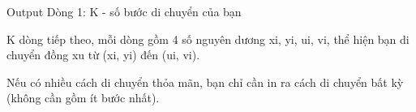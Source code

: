 Output  
Dòng 1: K - số bước di chuyển của bạn  

   K dòng tiếp theo, mỗi dòng gồm 4 số nguyên dương xi, yi, ui, vi, thể hiện bạn di chuyển đồng xu từ (xi, yi) đến (ui, vi).  

   Nếu có nhiều cách di chuyển thỏa mãn, bạn chỉ cần in ra cách di chuyển bất kỳ (không cần gồm ít bước nhất).